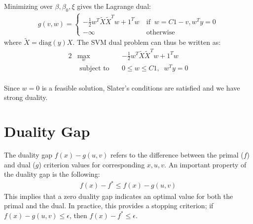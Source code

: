 \documentclass[11pt]{article}
\begin{document}
Minimizing over $\beta, \beta_{0}, \xi$ gives the Lagrange dual:
\begin{align*}
g(v, w) = \begin{cases}
-\frac{1}{2} w^{T}\tilde{X}\tilde{X}^{T}w + 1^{T}w ~& \text{if}\;\; w=C1-v, w^{T}y=0 \\
-\infty ~&\text{otherwise}
\end{cases}
\end{align*}
where $\tilde{X} = \text{diag}\left(y\right)X$. The SVM dual problem can thus be written as:
\begin{alignat*}{2}
&\max_{w} && -\frac{1}{2} w^{T}\tilde{X}\tilde{X}^{T}w + 1^{T}w \\
&\text{ subject to}&~& 0 \leq w \leq C1,\;\; w^{T}y=0 \\
\end{alignat*}

Since $w=0$ is a feasible solution, Slater's conditions are satisfied and we have strong duality.

\section{Duality Gap}
The duality gap $f\left(x\right) - g\left(u,v\right)$ refers to the difference between the primal ($f$) and dual ($g$) criterion values for corresponding $x, u, v$. An important property of the duality gap is the following:
\begin{align*}
f\left(x\right) - f^{*} \leq f\left(x\right) - g\left(u,v\right)
\end{align*}
This implies that a zero duality gap indicates an optimal value for both the primal and the dual. In practice, this provides a stopping criterion; if $f\left(x\right) - g\left(u,v\right) \leq \epsilon$, then $f\left(x\right) - f^{*} \leq \epsilon$.
\end{document}
